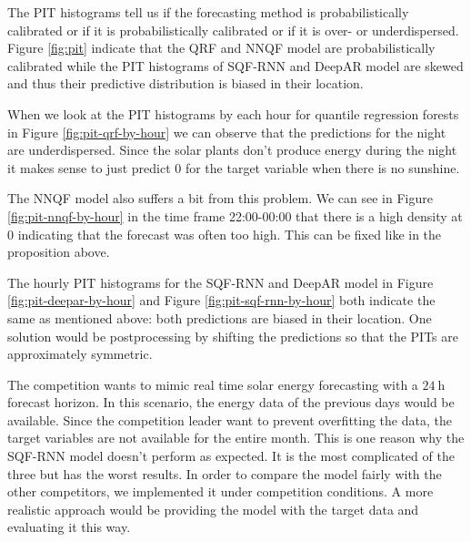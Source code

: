 The PIT histograms tell us if the forecasting method is probabilistically 
calibrated or if it is probabilistically calibrated or 
if it is over- or underdispersed. 
Figure \ref{fig:pit} indicate that the QRF and NNQF model are 
probabilistically calibrated while the PIT histograms of SQF-RNN 
and DeepAR model are skewed and thus their predictive distribution is 
biased in their location.

When we look at the PIT histograms by each hour 
for quantile regression forests in Figure \ref{fig:pit-qrf-by-hour} 
we can observe that the predictions for the night are underdispersed. 
Since the solar plants don't produce energy during the night 
it makes sense to just predict \(0\) for the target variable when there is 
no sunshine.

The NNQF model also suffers a bit from this problem. We can see 
in Figure \ref{fig:pit-nnqf-by-hour} in the time frame 22:00-00:00 that 
there is a high density at \(0\) indicating that the forecast 
was often too high. This can be fixed like in the proposition above.

The hourly PIT histograms for the SQF-RNN and DeepAR model in 
Figure \ref{fig:pit-deepar-by-hour} and Figure \ref{fig:pit-sqf-rnn-by-hour} 
both indicate the same as mentioned above: both predictions are biased 
in their location. One solution would be postprocessing by shifting the 
predictions so that the PITs are approximately symmetric. 

The competition wants to mimic real time solar energy forecasting with 
a \(\SI{24}{\hour}\) forecast horizon. In this scenario, the energy data of 
the previous days would be available. Since the competition leader want to 
prevent overfitting the data, the target variables are not available for 
the entire month. This is one reason why the SQF-RNN model doesn't perform 
as expected. 
It is the most complicated of the three but has the worst results. 
In order to compare the model fairly with the other competitors, 
we implemented it under competition conditions. A more realistic approach would be 
providing the model with the target data and evaluating it this way.